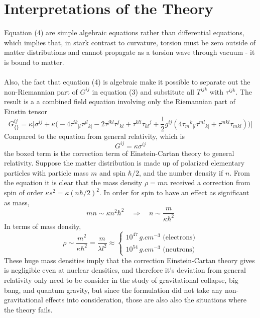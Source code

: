 \documentclass[12pt]{article}
\begin{document}
\section{Interpretations of the Theory}
Equation (4) are simple algebraic equations rather than differential equations, which implies that, in stark contrast to curvature, torsion must be zero outside of matter distributions and cannot propagate as a torsion wave through vacuum - it is bound to matter.\\\\
Also, the fact that equation (4) is algebraic make it possible to separate out the non-Riemannian part of $G^{ij}$ in equation (3) and substitute all $T^{ijk}$ with $\tau^{ijk}$. The result is a a combined field equation involving only the Riemannian part of Einstin tensor
\[ G^{ij}_{\{\}}  = \kappa \Bigg[\sigma^{ij} + \boxed{\kappa\Big( -4\tau^{ik}{}_{[l}\tau^{jl}{}_{k]} 
-2\tau^{jkl}\tau^j{}_{kl} + \tau^{kli}\tau_{kl}{}^j + \frac{1}{2}g^{ij}\left( 4\tau_m{}^k{}_{[l}\tau^{ml}{}_{k]} + \tau^{mkl}\tau_{mkl} \right)\Big)} \Bigg] \]
Compared to the equation from general relativity, which is
\[G^{ij} = \kappa \sigma^{ij} \]
the boxed term is the correction term of Einstein-Cartan theory to general relativity. Suppose the matter distribution is made up of polarized elementary particles with particle mass $m$ and spin $\hbar/2$, and the number density if $n$. From the equation it is clear  that the mass density $\rho = mn$ received a correction from spin of order $\kappa s^2 = \kappa (n\hbar/2)^2$. In order for spin to have an effect as significant as mass,
\[ mn \sim \kappa n^2\hbar^2 \quad\Rightarrow\quad n \sim \frac{m}{\kappa \hbar^2} \]
In terms of mass density,
\[ \rho \sim \frac{m^2}{\kappa \hbar^2} = \frac{m}{\lambda l^2} \approx \begin{cases}
10^{47} \, \si{g.cm^{-3}} \text{ (electrons)} \\
10^{54} \,\si{g.cm^{-3}} \text{ (neutrons)}
\end{cases}\]
These huge mass densities imply that the correction Einstein-Cartan theory gives is negligible even at nuclear densities, and therefore it's deviation from general relativity only need to be consider in the study of gravitational collapse, big bang, and quantum gravity, but since the formulation did not take any non-gravitational effects into consideration, those are also also the situations where the theory fails.
\end{document}
